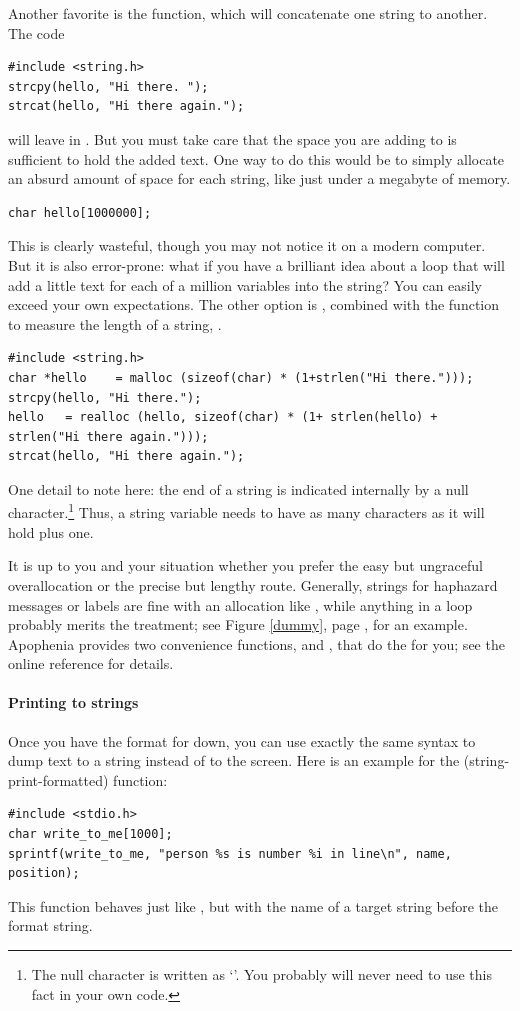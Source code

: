Another favorite is the  function, which will concatenate one
string to another. The code
\begin{lstlisting}
#include <string.h>
strcpy(hello, "Hi there. "); 
strcat(hello, "Hi there again."); 
\end{lstlisting}
will leave  in . But
you must take care that the space you are adding to is sufficient to
hold the added text. One way to do this would be to simply allocate an
absurd amount of space for each string, like just under a megabyte of
memory.
\begin{lstlisting}
char hello[1000000];
\end{lstlisting}
This is clearly wasteful, though you may not notice it on a modern
computer. But it is also error-prone: what if you have a brilliant idea
about a  loop that will add a little text for each of a
million variables into the string? You can easily exceed your own
expectations. The other option is , combined with the
function to measure the length of a string, .
\begin{lstlisting}
#include <string.h>
char *hello    = malloc (sizeof(char) * (1+strlen("Hi there.")));
strcpy(hello, "Hi there."); 
hello   = realloc (hello, sizeof(char) * (1+ strlen(hello) + strlen("Hi there again.")));
strcat(hello, "Hi there again."); 
\end{lstlisting}
One detail to note here: the end of a string is indicated internally by
a null character.\footnote{The null character is written as
`'. You probably will never need to use this
fact in your own code.} Thus, a string variable needs to have as many
characters as it will hold plus one.

It is up to you and your situation whether you prefer the easy but
ungraceful overallocation or the precise but lengthy 
route. Generally, strings for haphazard messages or labels are fine with 
an allocation like , while anything in a
 loop probably merits the  treatment;
see Figure \ref{dummy}, page \pageref{dummy}, for an example. Apophenia
provides two convenience functions,  and
, that do the  for you; see the
online reference for details.

\paragraph{Printing to strings} Once you have the format for  down, you can use exactly the
same syntax to dump text to a string instead of to the screen. Here is an example for the 
(string-print-formatted) function:
\begin{lstlisting}
#include <stdio.h>
char write_to_me[1000];
sprintf(write_to_me, "person %s is number %i in line\n", name, position);
\end{lstlisting}
This function behaves just like , but with the name of
a target string before the format string. 


